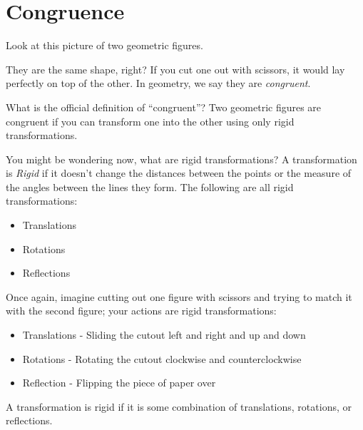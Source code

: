 \chapter{Congruence}
Look at this picture of two geometric figures.


They are the same shape, right? If you cut one out with scissors, it
would lay perfectly on top of the other. In geometry, we say they are
\emph{congruent}.

What is the official definition of ``congruent''? 
Two geometric figures are congruent if you can transform one into the other using
only rigid transformations. 

You might be wondering now, what are rigid transformations?
A transformation is \emph{Rigid} if it doesn't change the distances
between the points or the measure of the angles between the lines they
form. The following are all rigid transformations:
\begin{itemize}
\item Translations
\item Rotations
\item Reflections 
\end{itemize}

Once again, imagine cutting out one figure with scissors and trying to match it with the second figure; your actions are rigid transformations:
\begin{itemize}
\item Translations - Sliding the cutout left and right and up and down
\item Rotations	- Rotating the cutout clockwise and counterclockwise
\item Reflection - Flipping the piece of paper over
\end{itemize}

A transformation is rigid if it is some combination of translations, rotations, or reflections.

